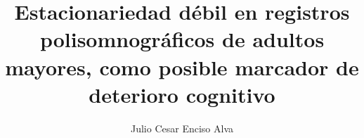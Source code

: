 \documentclass[12pt,letterpaper]{mitthesis}
\begin{document}
%
%
%
%
%
%
%
%
%
%
%
%
%

\setcounter{page}{0}
\thispagestyle{empty}

\title{Estacionariedad d\'ebil en registros polisomnogr\'aficos de adultos mayores,
como posible marcador de deterioro cognitivo}
\author{Julio Cesar Enciso Alva}
\end{document}
